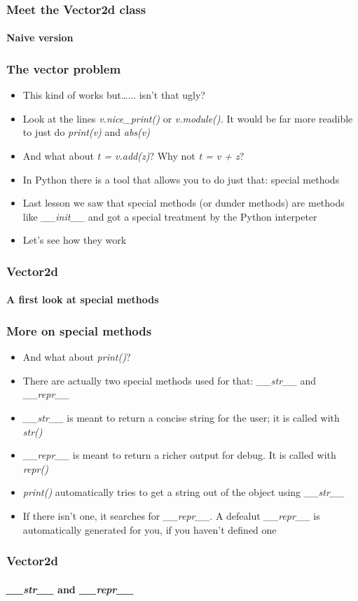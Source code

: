 \documentclass[9pt]{beamer}
\begin{document}
\begin{frame}
  \frametitle{Meet the Vector2d class}
  \framesubtitle{Naive version}
  
\end{frame}


\begin{frame}
  \frametitle{The vector problem}
  
  \begin{itemize}
    \item This kind of works but\dots... isn't that ugly?
    \medskip
    \item Look at the lines \emph{v.nice\_print()} or \emph{v.module().}
          It would be far more readible to just do \emph{print(v)} and \emph{abs(v)}
    \medskip
    \item And what about \emph{t = v.add(z)}? Why not \emph{t = v + z}?
    \medskip
    \item In Python there is a tool that allows you to do just that: \alert{special methods}
    \medskip
    \item Last lesson we saw that special methods (or dunder methods) are
          methods like \emph{\_\_init\_\_} and got a special treatment 
          by the Python interpeter
    \medskip
    \item Let's see how they work
  \end{itemize}
  
\end{frame}

  
\begin{frame}
  \frametitle{Vector2d}
  \framesubtitle{A first look at special methods}
  
\end{frame}


\begin{frame}
  \frametitle{More on special methods}
  
  \begin{itemize}
    \item And what about \emph{print()}?
    \item There are actually two special methods used for that: \emph{\_\_str\_\_} and \emph{\_\_repr\_\_}
    \medskip
    \item \emph{\_\_str\_\_} is meant to return a concise string for the user; it is called with \emph{str()}
    \medskip
    \item \emph{\_\_repr\_\_} is meant to return a richer output for debug. It is called with \emph{repr()}
    \medskip
    \item \emph{print()} automatically tries to get a string out of the object using \emph{\_\_str\_\_}
    \medskip
    \item If there isn't one, it searches for \emph{\_\_repr\_\_}. A defealut \emph{\_\_repr\_\_}
          is automatically generated for you, if you haven't defined one
  \end{itemize}
  
\end{frame}


\begin{frame}
  \frametitle{Vector2d}
  \framesubtitle{\emph{\_\_str\_\_} and \emph{\_\_repr\_\_}}
  
\end{frame}
\end{document}
